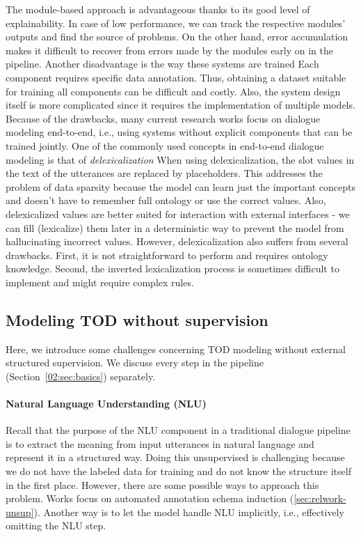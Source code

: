 The module-based approach is advantageous thanks to its good level of explainability.
In case of low performance, we can track the respective modules' outputs and find the source of problems.
On the other hand, error accumulation makes it difficult to recover from errors made by the modules early on in the pipeline.
Another disadvantage is the way these systems are trained \cite{li-etal-2017-end}
Each component requires specific data annotation.
Thus, obtaining a dataset suitable for training all components can be difficult and costly.
Also, the system design itself is more complicated since it requires the implementation of multiple models.
Because of the drawbacks, many current research works focus on dialogue modeling end-to-end, i.e., using systems without explicit components that can be trained jointly.
\label{02:delex}
One of the commonly used concepts in end-to-end dialogue modeling is that of \emph{delexicalization} \cite{wen-etal-2015-stochastic}
When using delexicalization, the slot values in the text of the utterances are replaced by placeholders.
This addresses the problem of data sparsity because the model can learn just the important concepts and doesn't have to remember full ontology or use the correct values.
Also, delexicalized values are better suited for interaction with external interfaces - we can fill (lexicalize) them later in a deterministic way to prevent the model from hallucinating incorrect values.
However, delexicalization also suffers from several drawbacks.
First, it is not straightforward to perform and requires ontology knowledge.
Second, the inverted lexicalization process is sometimes difficult to implement and might require complex rules.

\subsection{Modeling TOD without supervision}
\label{02:no-super}
Here, we introduce some challenges concerning TOD modeling without external structured supervision.
We discuss every step in the pipeline (Section~\ref{02:sec:basics}) separately.

\paragraph{Natural Language Understanding (NLU)}
Recall that the purpose of the NLU component in a traditional dialogue pipeline is to extract the meaning from input utterances in natural language and represent it in a structured way.
Doing this unsupervised is challenging because we do not have the labeled data for training and do not know the structure itself in the first place.
However, there are some possible ways to approach this problem.
Works focus on automated annotation schema induction (\ref{sec:relwork-unsup}).
Another way is to let the model handle NLU implicitly, i.e., effectively omitting the NLU step.

